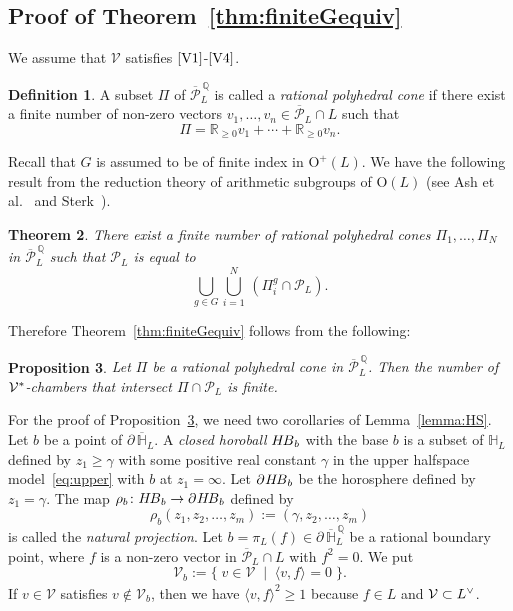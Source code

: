 \documentclass{amsart}
\theoremstyle{plain}
\newtheorem{theorem}{Theorem}[section]
\newtheorem{proposition}[theorem]{Proposition}
\theoremstyle{definition}
\newtheorem{definition}[theorem]{Definition}
\theoremstyle{remark}
\numberwithin{equation}{section}
\numberwithin{table}{section}
\numberwithin{figure}{section}
\renewcommand{\H}{\mathord{\mathbb H}}
\newcommand{\Q}{\mathord{\mathbb  Q}}
\newcommand{\R}{\mathord{\mathbb R}}
\newcommand{\PPP}{\mathord{\mathcal P}}
\newcommand{\VVV}{\mathord{\mathcal V}}
\newcommand{\set}[2]{\{\; {#1} \; \mid \; {#2} \;  \}}
\newcommand{\dual}{\sp{\vee}}
\newcommand{\bdr}{\partial\,}
\newcommand{\OG}{\mathord{\mathrm {O}}}
\newcommand{\intM}[2]{\langle{#1}\rangle_{#2}}
\newcommand{\sphyp}{\sp*}
\newcommand{\clPPP}{\overline{\PPP}}
\newcommand{\clPPPQ}{\overline{\PPP}^{\,\Q}}
\newcommand{\clH}{\overline{\H}}
\newcommand{\bdrclHQ}{\bdr\clH^{\,\Q}}
\newcommand{\HB}{\mathord{H\hskip -1pt B}}
\newcommand{\bdrHB}{\mathord{\bdr \hskip -1.2pt H\hskip -1.2pt B}}
\newcommand{\propVone}{\mathord{\rm [V1]}}
\newcommand{\propVfour}{\mathord{\rm [V4]}}
\begin{document}
\subsection{Proof of Theorem~\ref{thm:finiteGequiv}}
%
We assume that  $\VVV$ satisfies $\propVone$-$\propVfour$.
%
\begin{definition}
A subset $\Pi$ of $\clPPPQ_L$ is called a \emph{rational polyhedral cone}
if there  exist a finite number of non-zero vectors 
$v_1, \dots, v_n\in \clPPP_L\cap L$ such that 
$$
\Pi=\R_{\ge 0} v_1+ \cdots+ \R_{\ge 0} v_n.
$$
\end{definition}
%
Recall that $G$ is assumed to be of finite index in $\OG^+(L)$.
We have the following result from the reduction theory of arithmetic subgroups
of $\OG(L)$
(see Ash et al.~\cite[Chapter II, Section 4]{MR2590897} and Sterk~\cite{MR786280}).
%
\begin{theorem}\label{thm:ratpoly}
There exist a finite number of rational polyhedral cones
$\Pi_1, \dots, \Pi_N$ in $\clPPPQ_L$ such that $\PPP_L$ is equal to 
$$
\bigcup_{g \in G} \bigcup_{i=1}^N \,(\Pi_i^g\cap \PPP_L).
$$
\end{theorem} 
%
Therefore 
Theorem~\ref{thm:finiteGequiv} follows from  the following:
%
\begin{proposition}\label{prop:Pi}
Let $\Pi$ be a rational polyhedral cone in $\clPPPQ_L$.
Then the number of $\VVV\sphyp$-chambers that intersect $\Pi\cap\PPP_L$ is finite.
\end{proposition}
%
For the proof of Proposition~\ref{prop:Pi},
we need two corollaries of Lemma~\ref{lemma:HS}.
% 
Let $b$ be a point of $\bdr\clH_L$.
A \emph{closed horoball}  $\HB_b$ with the base $b$ is a subset of $\H_L$ defined  by 
$z_1\ge \gamma$ with some positive real constant $\gamma$
in the upper halfspace model~\eqref{eq:upper}
with $b$ at $z_1=\infty$.
Let $\bdrHB_b$ be the horosphere defined  by $z_1=  \gamma$.
The map $\rho_b\colon \HB_b\to \bdrHB_b$ defined by  
$$
\rho_b(z_1, z_2, \dots, z_m):=(\gamma, z_2, \dots, z_m)
$$
is called the \emph{natural projection}.
Let $b=\pi_L(f)\in \bdrclHQ_L$  be a rational  boundary point,
where $f$ is a non-zero vector in $\clPPP_L \cap L$ with  $f^2=0$.
We put
$$
\VVV_b:=\set{v\in \VVV}{\intM{v, f}{}=0}.
$$
If  $v\in \VVV$ satisfies $v\notin\VVV_b$,
then we have $\intM{v, f}{}^2\ge 1$ because $f\in L$ and $\VVV\subset L\dual$. 
\end{document}
